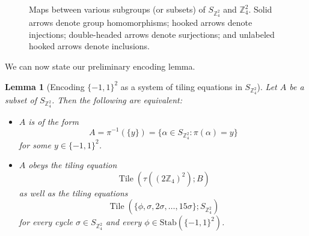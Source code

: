 \documentclass[reqno,a4paper,12pt]{amsart}
\numberwithin{equation}{section}
\numberwithin{figure}{section}
\def\Z{\mathbb{Z}}
\newcommand{\Tile}{\operatorname{Tile}}
\theoremstyle{plain}
\newtheorem{lemma}[thm]{Lemma}
\theoremstyle{definition}
\begin{document}
\begin{figure}
    \centering
    \caption{Maps between various subgroups (or subsets) of $S_{\Z_4^2}$ and $\Z_4^2$.  Solid arrows denote group homomorphisms; hooked arrows denote injections; double-headed arrows denote surjections; and unlabeled hooked arrows denote inclusions.}
    \label{fig:group}
\end{figure}

We can now state our preliminary encoding lemma.

\begin{lemma}[Encoding $\{-1,1\}^2$ as a system of tiling equations in $S_{\Z_4^2}$]\label{tiling-system}  Let $A$ be a subset of $S_{\Z_4^2}$.  Then the following are equivalent:
\begin{itemize}
\item[(i)] $A$ is of the form
\begin{equation}\label{aok}
A = \pi^{-1}(\{y\}) = \{ \alpha \in S_{\Z_4^2}: \pi(\alpha) = y \}
\end{equation}
for some $y \in \{-1,1\}^2$.
\item[(ii)]  $A$ obeys the tiling equation
\begin{equation}\label{a-tau}
\Tile( \tau((2\Z_4)^2) ; B )
\end{equation}
 as well as the tiling equations
\begin{equation}\label{a-cycle}
\Tile( \{ \phi, \sigma, 2\sigma, \dots, 15 \sigma\} ; S_{\Z_4^2} )
\end{equation}
for every cycle $\sigma \in S_{\Z_4^2}$ and every $\phi \in \mathrm{Stab}(\{-1,1\}^2)$.
\end{itemize}
\end{lemma}
\end{document}
